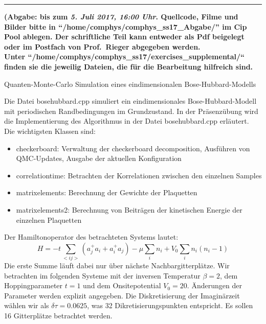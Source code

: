 \documentclass[german,10pt,a4paper]{newexam}
\begin{document}
\vspace*{-0.5cm}\hrule
\begin{center} 
{\bfseries \sf(Abgabe: bis zum \textit{5. Juli 2017, 16:00 Uhr}.
Quellcode, Filme und Bilder bitte in ``/home/comphys/comphys\_ss17\_Abgabe/'' im Cip Pool ablegen.
Der schriftliche Teil kann entweder als Pdf beigelegt oder im Postfach von Prof.~Rieger abgegeben werden.
\\
Unter ``/home/comphys/comphys\_ss17/exercises\_supplemental/`` finden sie die jeweilig Dateien, die 
f\"ur die Bearbeitung hilfreich sind.
}\\[.3cm]
\end{center}
\begin{center} 

\Large Quanten-Monte-Carlo Simulation eines eindimensionalen Bose-Hubbard-Modells\\[.3cm]
\normalsize

\end{center}


Die Datei bosehubbard.cpp simuliert ein 
eindimensionales Bose-Hubbard-Modell mit periodischen Randbedingungen im Grundzustand.
In der Präsenzübung wird die Implementierung des Algorithmus in der Datei 
bosehubbard.cpp erläutert. Die wichtigsten Klassen sind:
	\begin{itemize}
 		\item checkerboard: Verwaltung der checkerboard decomposition, 
 		Ausführen von QMC-Updates, Ausgabe der aktuellen Konfiguration
		\item correlationtime: Betrachten der Korrelationen zwischen den einzelnen Samples
		\item matrixelements: Berechnung der Gewichte der Plaquetten
		\item matrixelements2: Berechnung von Beiträgen der kinetischen Energie der einzelnen Plaquetten
	\end{itemize}

Der Hamiltonoperator des betrachteten Systems lautet: 
\begin{equation}
  H = -t \sum_{<ij>}(a_j^+ a_i + a_i^+ a_j) - \mu \sum_i n_i + V_0 \sum_i n_i(n_i-1)
\end{equation}
Die erste Summe läuft dabei nur über nächste Nachbargitterplätze. 
Wir betrachten im folgenden Systeme mit der inversen Temperatur $\beta = 2$, 
dem Hoppingparameter $t = 1$ und dem Onsitepotential $V_0 = 20$. 
Änderungen der Parameter werden explizit angegeben. 
Die Diskretisierung der Imaginärzeit wählen wir als $\delta \tau = 0.0625$, was 32 Dikretisierungspunkten entspricht.
Es sollen 16 Gitterplätze betrachtet werden.
\end{document}

